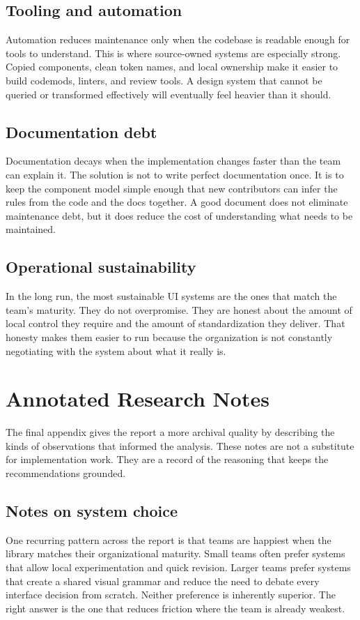 \documentclass[11pt,twoside,a4paper]{article}
\begin{document}
\subsection{Tooling and automation}
Automation reduces maintenance only when the codebase is readable enough for tools to understand. This is where source-owned systems are especially strong. Copied components, clean token names, and local ownership make it easier to build codemods, linters, and review tools. A design system that cannot be queried or transformed effectively will eventually feel heavier than it should.

\subsection{Documentation debt}
Documentation decays when the implementation changes faster than the team can explain it. The solution is not to write perfect documentation once. It is to keep the component model simple enough that new contributors can infer the rules from the code and the docs together. A good document does not eliminate maintenance debt, but it does reduce the cost of understanding what needs to be maintained.

\subsection{Operational sustainability}
In the long run, the most sustainable UI systems are the ones that match the team's maturity. They do not overpromise. They are honest about the amount of local control they require and the amount of standardization they deliver. That honesty makes them easier to run because the organization is not constantly negotiating with the system about what it really is.

\section{Annotated Research Notes}
The final appendix gives the report a more archival quality by describing the kinds of observations that informed the analysis. These notes are not a substitute for implementation work. They are a record of the reasoning that keeps the recommendations grounded.

\subsection{Notes on system choice}
One recurring pattern across the report is that teams are happiest when the library matches their organizational maturity. Small teams often prefer systems that allow local experimentation and quick revision. Larger teams prefer systems that create a shared visual grammar and reduce the need to debate every interface decision from scratch. Neither preference is inherently superior. The right answer is the one that reduces friction where the team is already weakest.
\end{document}
